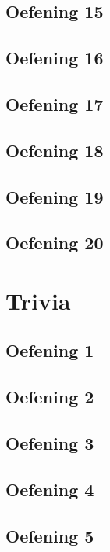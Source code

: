 \documentclass[a4paper,11pt]{report}
\begin{document}
\section{Oefening 15}

\section{Oefening 16}

\section{Oefening 17}

\section{Oefening 18}

\section{Oefening 19}

\section{Oefening 20}

\newpage

\chapter{Trivia}
\section{Oefening 1}

\section{Oefening 2}

\section{Oefening 3}

\section{Oefening 4}

\section{Oefening 5}

\newpage
\end{document}

